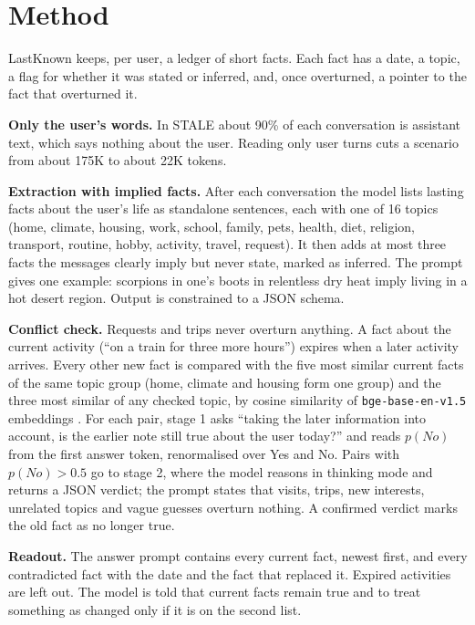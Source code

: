 \documentclass[10pt,twocolumn]{article}
\begin{document}
\section{Method}

LastKnown keeps, per user, a ledger of short facts. Each fact has a date, a topic, a flag for whether it was stated or
inferred, and, once overturned, a pointer to the fact that overturned it.

\textbf{Only the user's words.} In STALE about 90\% of each conversation is assistant text, which says nothing about
the user. Reading only user turns cuts a scenario from about 175K to about 22K tokens.

\textbf{Extraction with implied facts.} After each conversation the model lists lasting facts about the user's life
as standalone sentences, each with one of 16 topics (home, climate, housing, work, school, family, pets, health, diet,
religion, transport, routine, hobby, activity, travel, request). It then adds at most three facts the messages clearly
imply but never state, marked as inferred. The prompt gives one example: scorpions in one's boots in relentless dry
heat imply living in a hot desert region. Output is constrained to a JSON schema.

\textbf{Conflict check.} Requests and trips never overturn anything. A fact about the current activity (``on a train
for three more hours'') expires when a later activity arrives. Every other new fact is compared with the five most
similar current facts of the same topic group (home, climate and housing form one group) and the three most similar
of any checked topic, by cosine similarity of \texttt{bge-base-en-v1.5} embeddings \cite{bge}. For each pair, stage 1
asks ``taking the later information into account, is the earlier note still true about the user today?'' and reads
$p(\textit{No})$ from the first answer token, renormalised over Yes and No. Pairs with $p(\textit{No})>0.5$ go to stage
2, where the model reasons in thinking mode and returns a JSON verdict; the prompt states that visits, trips, new
interests, unrelated topics and vague guesses overturn nothing. A confirmed verdict marks the old fact as no longer
true.

\textbf{Readout.} The answer prompt contains every current fact, newest first, and every contradicted fact with the
date and the fact that replaced it. Expired activities are left out. The model is told that current facts remain true
and to treat something as changed only if it is on the second list.
\end{document}
